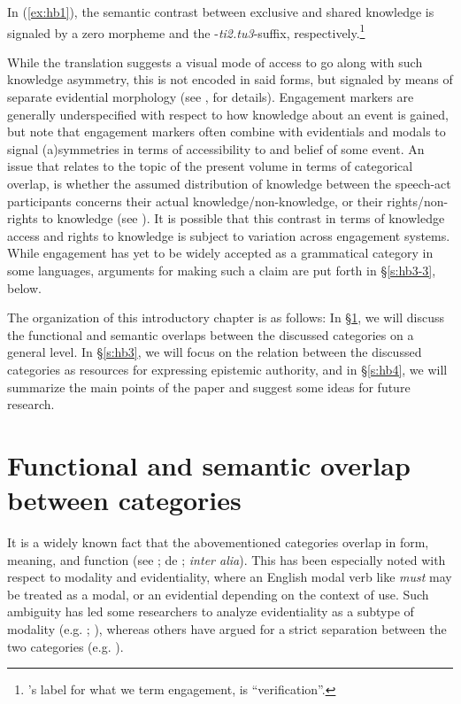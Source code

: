 \documentclass[output=paper]{langsci/langscibook}
\begin{document}
In (\ref{ex:hb1}), the semantic contrast between exclusive and shared knowledge is signaled by a zero morpheme and the -\textit{ti2.tu3}-suffix, respectively.\footnote{\citeauthor{Kroeker2001}’s label for what we term engagement, is ``verification”.}

While the translation suggests a visual mode of access to go along with such knowledge asymmetry, this is not encoded in said forms, but signaled by means of separate evidential morphology (see \citealt{Kroeker2001}, for details).
Engagement markers are generally underspecified with respect to how knowledge about an event is gained, but \cite{Evansetal2017b} note that engagement markers often combine with evidentials and modals to signal (a)symmetries in terms of accessibility to and belief of some event. An issue that relates to the topic of the present volume in terms of categorical overlap, is whether the assumed distribution of knowledge between the speech-act participants concerns their actual knowledge/non-knowledge, or their rights/non-rights to knowledge (see ).
It is possible that this contrast in terms of knowledge access and rights to knowledge is subject to variation across engagement systems. While engagement has yet to be widely accepted as a grammatical category in some languages, arguments for making such a claim are put forth in §\ref{s:hb3-3}, below. 

The organization of this introductory chapter is as follows: In §\ref{s:hb2}, we will discuss the functional and semantic overlaps between the discussed categories on a general level. In §\ref{s:hb3}, we will focus on the relation between the discussed categories as resources for expressing epistemic authority, and in §\ref{s:hb4}, we will summarize the main points of the paper and suggest some ideas for future research.

\section{Functional and semantic overlap between categories}\label{s:hb2}
 
It is a widely known fact that the abovementioned categories overlap in form, meaning, and function (see \citealt{Cornillie2009}; de \citealt{Haan1999}; \emph{inter alia}). This has been especially noted with respect to modality and evidentiality, where an English modal verb like \emph{must} may be treated as a modal, or an evidential depending on the context of use. Such ambiguity has led some researchers to analyze evidentiality as a subtype of modality (e.g. \citealt{Palmer1986}; \citealt{Palmer2001}), whereas others have argued for a strict separation between the two categories (e.g. \citealt{Aikhenvald2004}).
\end{document}
